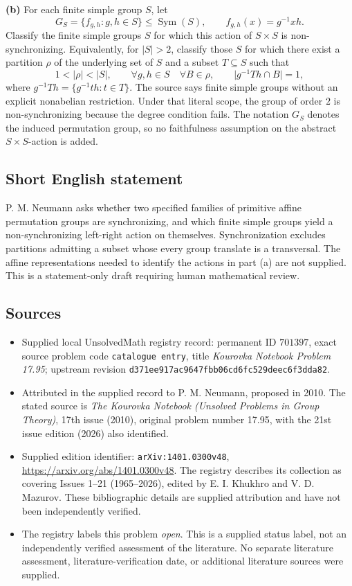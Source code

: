 \documentclass[11pt]{article}
\begin{document}
\textbf{(b)} For each finite simple group \(S\), let
\[
G_S=\{f_{g,h}:g,h\in S\}\leq\operatorname{Sym}(S),
\qquad f_{g,h}(x)=g^{-1}xh.
\]
Classify the finite simple groups \(S\) for which this action of \(S\times S\) is non-synchronizing. Equivalently, for \(|S|>2\), classify those \(S\) for which there exist a partition \(\rho\) of the underlying set of \(S\) and a subset \(T\subseteq S\) such that
\[
1<|\rho|<|S|,
\qquad
\forall g,h\in S\quad\forall B\in\rho,\qquad
\bigl|g^{-1}Th\cap B\bigr|=1,
\]
where \(g^{-1}Th=\{g^{-1}th:t\in T\}\). The source says finite simple groups without an explicit nonabelian restriction. Under that literal scope, the group of order \(2\) is non-synchronizing because the degree condition fails. The notation \(G_S\) denotes the induced permutation group, so no faithfulness assumption on the abstract \(S\times S\)-action is added.
\subsection{Short English statement}
P. M. Neumann asks whether two specified families of primitive affine permutation groups are synchronizing, and which finite simple groups yield a non-synchronizing left-right action on themselves. Synchronization excludes partitions admitting a subset whose every group translate is a transversal. The affine representations needed to identify the actions in part (a) are not supplied. This is a statement-only draft requiring human mathematical review.
\subsection{Sources}
\begin{itemize}
\item Supplied local UnsolvedMath registry record: permanent ID \(701397\), exact source problem code \texttt{catalogue entry}, title \emph{Kourovka Notebook Problem 17.95}; upstream revision \texttt{d371ee917ac9647fbb06cd6fc529deec6f3dda82}.
\item Attributed in the supplied record to P. M. Neumann, proposed in 2010. The stated source is \emph{The Kourovka Notebook (Unsolved Problems in Group Theory)}, 17th issue (2010), original problem number 17.95, with the 21st issue edition (2026) also identified.
\item Supplied edition identifier: \texttt{arXiv:1401.0300v48}, \url{https://arxiv.org/abs/1401.0300v48}. The registry describes its collection as covering Issues 1--21 (1965--2026), edited by E. I. Khukhro and V. D. Mazurov. These bibliographic details are supplied attribution and have not been independently verified.
\item The registry labels this problem \emph{open}. This is a supplied status label, not an independently verified assessment of the literature. No separate literature assessment, literature-verification date, or additional literature sources were supplied.
\end{itemize}
\end{document}
